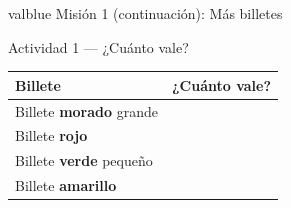 \documentclass[12pt]{article}
\newcommand{\boxfill}[1][3cm]{%
  \tcbox[on line, size=minimal,
    colframe=valdark!60, colback=white,
    boxrule=1pt, arc=2mm,
    boxsep=4pt, left=3pt, right=3pt, top=3pt, bottom=3pt]%
  {\makebox[#1]{\vphantom{Mg}}}}
\begin{document}
\begin{mision}{valblue}{\; Misión 1 (continuación): Más billetes}
\begin{actividad}{Actividad 1 --- ¿Cuánto vale?}
\renewcommand{\arraystretch}{1.8}
\begin{tabular}{|m{6cm}|m{4cm}|}
  \hline
  \rowcolor{valblue!15}
  \textbf{Billete} & \textbf{¿Cuánto vale?} \\
  \hline
  Billete \textbf{morado} grande & \boxfill[3.5cm] \\
  \hline
  Billete \textbf{rojo} & \boxfill[3.5cm] \\
  \hline
  Billete \textbf{verde} pequeño & \boxfill[3.5cm] \\
  \hline
  Billete \textbf{amarillo} & \boxfill[3.5cm] \\
  \hline
\end{tabular}
\end{actividad}

\end{mision}

\newpage
\end{document}
